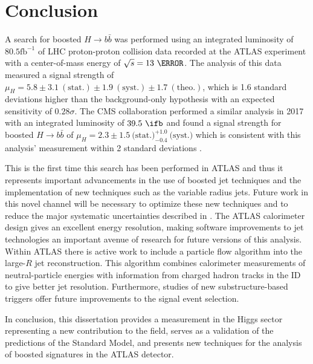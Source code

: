 \chapter{Conclusion} \label{chap:conclusion}

A search for boosted $H \rightarrow b\bar{b}$ was performed using an integrated
luminosity of $80.5 \text{fb}^{-1}$ of LHC proton-proton collision data
recorded at the ATLAS experiment with a center-of-mass energy of $\sqrt{s} =
13~\TeV$. The analysis of this data measured a signal strength of $\mu_{H} =
5.8 \pm 3.1~\mathrm{(stat.)} \pm 1.9~\mathrm{(syst.)} \pm
1.7~\mathrm{(theo.)}$, which is 1.6 standard deviations higher than the
background-only hypothesis with an expected sensitivity of $0.28\sigma$.  The
CMS collaboration performed a similar analysis in 2017 with an integrated
luminosity of $39.5~\ifb$ and found a signal strength for boosted $H
\rightarrow b\bar{b}$ of $\mu_{H} = 2.3 \pm
1.5~\text{(stat.)}_{-0.4}^{+1.0}~\text{(syst.)}$ which is consistent with this
analysis' measurement within 2 standard deviations \cite{Sirunyan:2017dgc}.

This is the first time this search has been performed in ATLAS and thus it
represents important advancements in the use of boosted jet techniques and the
implementation of new techniques such as the variable radius jets.  Future work
in this novel channel will be necessary to optimize these new techniques and to
reduce the major systematic uncertainties described in .  The ATLAS
calorimeter design gives an excellent energy resolution,
making software improvements to jet technologies an important avenue of
research for future versions of this analysis. Within ATLAS there is active
work to include a  particle flow algorithm into the large-$R$ jet
reconstruction. This algorithm combines calorimeter measurements of
neutral-particle energies with information from charged hadron tracks in the ID
to give better jet resolution.  Furthermore, studies of new substructure-based
triggers offer future improvements to the signal event selection.

In conclusion, this dissertation provides a measurement in the Higgs sector
representing a new contribution to the field, serves as a validation of the
predictions of the Standard Model, and presents new techniques for the analysis
of boosted signatures in the ATLAS detector.
